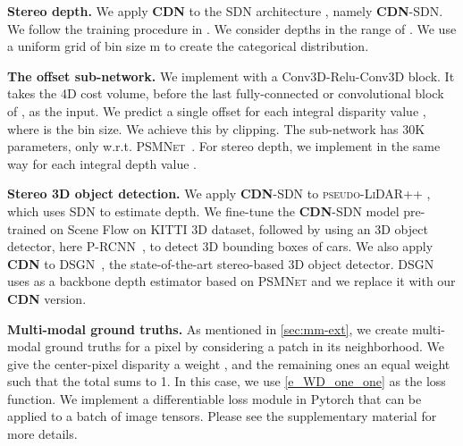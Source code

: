 \documentclass{article}
\newcommand{\method}[1]{\textsc{#1}}
\newcommand{\SDN}{\method{SDN}\xspace}
\newcommand{\PRCNN}{\method{P-RCNN}\xspace}
\newcommand{\PL}{\method{pseudo-LiDAR}\xspace}
\newcommand{\PSMNet}{\method{PSMNet}\xspace}
\newcommand{\DSGN}{\method{DSGN}\xspace}
\newcommand{\CDN}{\textbf{\method{CDN}}\xspace}
\renewcommand{\paragraph}[1]{\vspace{-0.5ex}\textbf{#1}}
\begin{document}
\paragraph{Stereo depth.}
We apply \CDN to the \SDN architecture \cite{you2019pseudo}, namely \CDN-\SDN.
We follow the training procedure in \cite{you2019pseudo}. We consider depths in the range of .  We use a uniform grid of bin size m to create the categorical distribution.

\paragraph{The offset sub-network.}
We implement  with a Conv3D-Relu-Conv3D block. It takes the 4D cost volume, before the last fully-connected or convolutional block of , as the input. We predict a single offset  for each integral disparity value , where  is the bin size. We achieve this by clipping. The sub-network has 30K parameters, only  w.r.t. \PSMNet~\cite{chang2018pyramid}. For stereo depth, we implement  in the same way for each integral depth value . 

\paragraph{Stereo 3D object detection.}
We apply \CDN-\SDN to \PL++ \cite{you2019pseudo}, which uses \SDN to estimate depth. We fine-tune the \CDN-\SDN model pre-trained on Scene Flow on KITTI 3D dataset, followed by using an 3D object detector, here \PRCNN~\cite{shi2019pointrcnn}, to detect 3D bounding boxes of cars. We also apply \CDN to \DSGN~\cite{chen2020dsgn}, the state-of-the-art stereo-based 3D object detector. \DSGN uses as a backbone depth estimator based on \PSMNet and we replace it with our \CDN version.



\paragraph{Multi-modal ground truths.}
As mentioned in \autoref{sec:mm-ext}, we create multi-modal ground truths for a pixel by considering a patch in its  neighborhood. We give the center-pixel disparity a weight , and the remaining ones an equal weight such that the total sums to 1. In this case, we use \autoref{e_WD_one_one} as the loss function. We implement a differentiable loss module in Pytorch that can be applied to a batch of image tensors. Please see the supplementary material for more details. 
\end{document}
